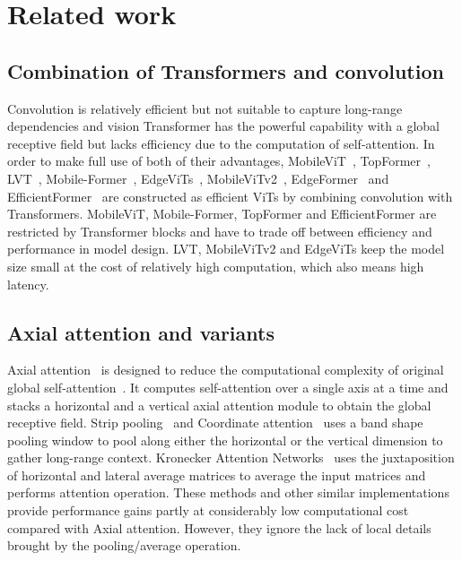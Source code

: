 \section{Related work}
\label{Rel_wk}

\subsection{Combination of Transformers and convolution}
Convolution is relatively efficient but not suitable to capture long-range dependencies and vision Transformer has the powerful capability with a global receptive field but lacks efficiency due to the computation of self-attention. 
In order to make full use of both of their advantages, MobileViT~\cite{mehta2021mobilevit}, TopFormer~\cite{zhang2022topformer}, LVT~\cite{yang2022lite}, Mobile-Former~\cite{chen2022mobile}, EdgeViTs~\cite{pan2022edgevits}, MobileViTv2~\cite{mehta2022separable}, EdgeFormer~\cite{zhang2022edgeformer} and EfficientFormer~\cite{li2022efficientformer} are constructed as efficient ViTs by combining convolution with Transformers. MobileViT, Mobile-Former, TopFormer and EfficientFormer are restricted by Transformer blocks and have to trade off between efficiency and performance in model design. LVT, MobileViTv2 and EdgeViTs keep the model size small at the cost of relatively high computation, which also means high latency.

\subsection{Axial attention and variants}
Axial attention~\cite{huang2019ccnet, ho2019axial, wang2020axial} is designed to reduce the computational complexity of original global self-attention~\cite{vaswani2017attention}. 
It computes self-attention over a single axis at a time and stacks a horizontal and a vertical axial attention module to obtain the global receptive field. 
Strip pooling~\cite{hou2020strip} and Coordinate attention~\cite{hou2021coordinate} uses a band shape pooling window to pool along either the horizontal or the vertical dimension to gather long-range context. Kronecker Attention Networks~\cite{gao2020kronecker} uses the juxtaposition of horizontal and lateral average matrices to average the input matrices and performs attention operation. These methods and other similar implementations provide performance gains partly at considerably low computational cost compared with Axial attention. However, they ignore the lack of local details brought by the pooling/average operation. 

